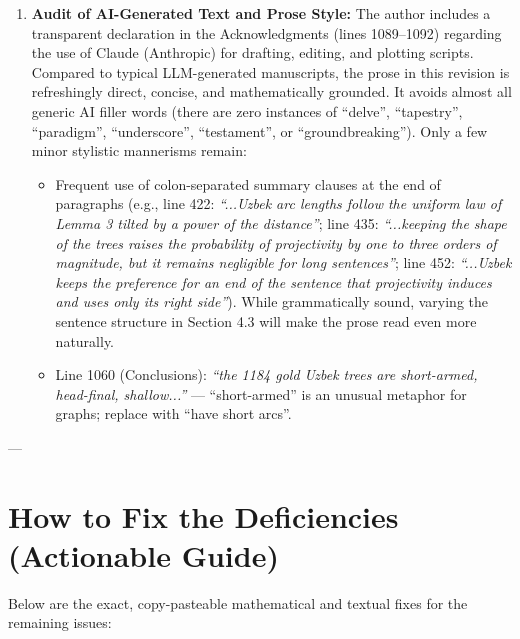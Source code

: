 \documentclass[11pt,a4paper]{article}
\begin{document}
\begin{enumerate}[label=\textbf{Issue \arabic*:}, resume, wide, labelwidth=!, labelindent=0pt]
    \item \textbf{Audit of AI-Generated Text and Prose Style:}
    The author includes a transparent declaration in the Acknowledgments (lines 1089--1092) regarding the use of Claude (Anthropic) for drafting, editing, and plotting scripts. Compared to typical LLM-generated manuscripts, the prose in this revision is refreshingly direct, concise, and mathematically grounded. It avoids almost all generic AI filler words (there are zero instances of ``delve'', ``tapestry'', ``paradigm'', ``underscore'', ``testament'', or ``groundbreaking''). Only a few minor stylistic mannerisms remain:
    \begin{itemize}
        \item Frequent use of colon-separated summary clauses at the end of paragraphs (e.g., line 422: \textit{``...Uzbek arc lengths follow the uniform law of Lemma 3 tilted by a power of the distance''}; line 435: \textit{``...keeping the shape of the trees raises the probability of projectivity by one to three orders of magnitude, but it remains negligible for long sentences''}; line 452: \textit{``...Uzbek keeps the preference for an end of the sentence that projectivity induces and uses only its right side''}). While grammatically sound, varying the sentence structure in Section 4.3 will make the prose read even more naturally.
        \item Line 1060 (Conclusions): \textit{``the 1184 gold Uzbek trees are short-armed, head-final, shallow...''} --- ``short-armed'' is an unusual metaphor for graphs; replace with ``have short arcs''.
    \end{itemize}
\end{enumerate}

---

\section{How to Fix the Deficiencies (Actionable Guide)}

Below are the exact, copy-pasteable mathematical and textual fixes for the remaining issues:
\end{document}
